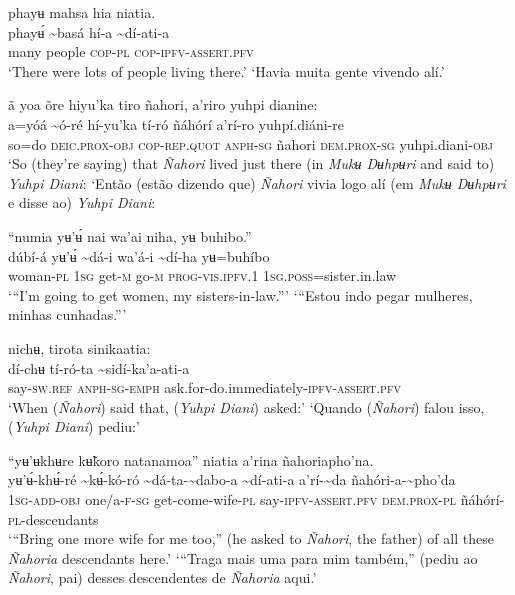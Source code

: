 \documentclass[output=paper,
modfonts,nonflat
]{langsci/langscibook}
\begin{document}
\ea phayʉ mahsa hia niatia. \\[.3em]
\gll phayʉ́	{\textasciitilde}basá	hí-a	{\textasciitilde}dí-ati-a \\
     many	people	\textsc{cop-pl}	\textsc{cop-ipfv-assert.pfv} \\
\glt ‘There were lots of people living there.’
\glt ‘Havia muita gente vivendo alí.’
\z 

\ea ã yoa õre hiyu'ka tiro ñahori, a’riro yuhpi dianine: \\[.3em]
\gll {\textasciitilde}a=yóá	{\textasciitilde}ó-ré	hí-yu'ka	tí-ró	ñáhórí	a’rí-ro	yuhpí.diáni-re \\
     so=do	\textsc{deic.prox-obj}	\textsc{cop-rep.quot}	\textsc{anph-sg}	ñahori	\textsc{dem.prox-sg}	yuhpi.diani\textsc{-obj} \\
\glt ‘So (they’re saying) that \textit{Ñahori} lived just there (in \textit{Mukʉ Dʉhpʉri} and said to) \textit{Yuhpi Diani}:
\glt ‘Então (estão dizendo que) \textit{Ñahori} vivia logo alí (em \textit{Mukʉ Dʉhpʉri} e disse ao) \textit{Yuhpi Diani}:
\z 

\ea “numia yʉ’ʉ́ nai wa'ai niha, yʉ buhibo.” \\[.3em]
\gll {\textasciitilde}dúbí-á	yʉ’ʉ́	{\textasciitilde}dá-i	wa'á-i	{\textasciitilde}dí-ha	yʉ=buhíbo \\
     woman-\textsc{pl}	1\textsc{sg}	get-\textsc{m}	go-\textsc{m}	\textsc{prog-vis.ipfv.}1	1\textsc{sg.poss}=sister.in.law \\
\glt ‘“I'm going to get women, my sisters-in-law.”’
\glt ‘“Estou indo pegar mulheres, minhas cunhadas.”’ 
\z

\newpage 
\ea nichʉ, tirota sinikaatia: \\[.3em]
\gll {\textasciitilde}dí-chʉ	tí-ró-ta	{\textasciitilde}sidí-ka’a-ati-a \\
     say-\textsc{sw.ref}	\textsc{anph-sg-emph}	ask.for-do.immediately-\textsc{ipfv-assert.pfv} \\
\glt ‘When (\textit{Ñahori}) said that, (\textit{Yuhpi Diani}) asked:’
\glt ‘Quando (\textit{Ñahori}) falou isso, (\textit{Yuhpi Diani}) pediu:’
\z 

\ea “yʉ’ʉkhʉre kʉ̃koro natanamoa” niatia a’rina ñahoriapho'na. \\[.3em]
\gll yʉ’ʉ́-khʉ́-ré	{\textasciitilde}kʉ́-kó-ró	{\textasciitilde}dá-ta-{\textasciitilde}dabo-a	{\textasciitilde}dí-ati-a	a’rí-{\textasciitilde}da	ñahóri-a-{\textasciitilde}pho'da \\
     1\textsc{sg-add-obj}  	one/a-\textsc{f-sg}	get-come-wife-\textsc{pl}	say-\textsc{ipfv-assert.pfv}	\textsc{dem.prox-pl}	ñáhórí-\textsc{pl}-descendants \\
\glt ‘“Bring one more wife for me too,” (he asked to \textit{Ñahori}, the father) of all these \textit{Ñahoria} descendants here.’
\glt ‘“Traga mais uma para mim também,” (pediu ao \textit{Ñahori}, pai) desses descendentes de \textit{Ñahoria} aqui.’
\z 
\end{document}
